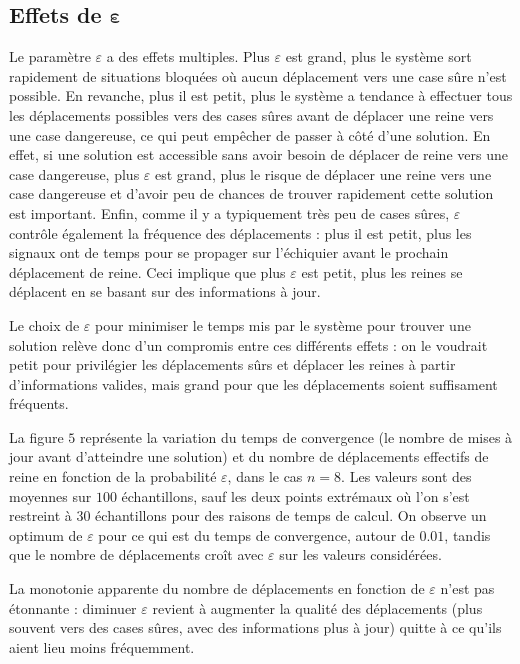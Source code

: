 \documentclass[11pt, openany]{article}
\begin{document}
\subsection*{Effets de $\boldsymbol \varepsilon$}



Le paramètre $\varepsilon$ a des effets multiples. Plus $\varepsilon$ est grand, plus le système sort rapidement de situations bloquées où aucun déplacement vers une case sûre n'est possible. En revanche, plus il est petit, plus le système a tendance à effectuer tous les déplacements possibles vers des cases sûres avant de déplacer une reine vers une case dangereuse, ce qui peut empêcher de passer à côté d'une solution. En effet, si une solution est accessible sans avoir besoin de déplacer de reine vers une case dangereuse, plus $\varepsilon$ est grand, plus le risque de déplacer une reine vers une case dangereuse et d'avoir peu de chances de trouver rapidement cette solution est important. Enfin, comme il y a typiquement très peu de cases sûres, $\varepsilon$ contrôle également la fréquence des déplacements : plus il est petit, plus les signaux ont de temps pour se propager sur l'échiquier avant le prochain déplacement de reine. Ceci implique que plus $\varepsilon$ est petit, plus les reines se déplacent en se basant sur des informations à jour. 

Le choix de $\varepsilon$ pour minimiser le temps mis par le système pour trouver une solution relève donc d'un compromis entre ces différents effets : on le voudrait petit pour privilégier les déplacements sûrs et déplacer les reines à partir d'informations valides, mais grand pour que les déplacements soient suffisament fréquents.

La figure $5$ représente la variation du temps de convergence (le nombre de mises à jour avant d'atteindre une solution) et du nombre de déplacements effectifs de reine en fonction de la probabilité $\varepsilon$, dans le cas $n=8$. Les valeurs sont des moyennes sur $100$ échantillons, sauf les deux points extrémaux où l'on s'est restreint à $30$ échantillons pour des raisons de temps de calcul. On observe un optimum de $\varepsilon$ pour ce qui est du temps de convergence, autour de $0.01$, tandis que le nombre de déplacements croît avec $\varepsilon$ sur les valeurs considérées. 

La monotonie apparente du nombre de déplacements en fonction de $\varepsilon$ n'est pas étonnante : diminuer $\varepsilon$ revient à augmenter la qualité des déplace\-ments (plus souvent vers des cases sûres, avec des informations plus à jour) quitte à ce qu'ils aient lieu moins fréquemment.
\end{document}
